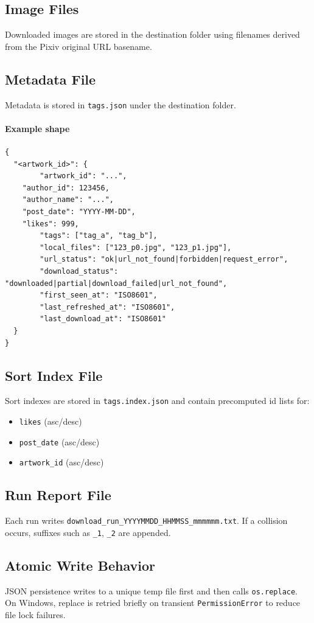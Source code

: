 \documentclass[11pt]{article}
\begin{document}
\subsection{Image Files}
Downloaded images are stored in the destination folder using filenames derived from the Pixiv original URL basename.

\subsection{Metadata File}
Metadata is stored in \texttt{tags.json} under the destination folder.

\paragraph{Example shape}
\begin{verbatim}
{
  "<artwork_id>": {
        "artwork_id": "...",
    "author_id": 123456,
    "author_name": "...",
    "post_date": "YYYY-MM-DD",
    "likes": 999,
        "tags": ["tag_a", "tag_b"],
        "local_files": ["123_p0.jpg", "123_p1.jpg"],
        "url_status": "ok|url_not_found|forbidden|request_error",
        "download_status": "downloaded|partial|download_failed|url_not_found",
        "first_seen_at": "ISO8601",
        "last_refreshed_at": "ISO8601",
        "last_download_at": "ISO8601"
  }
}
\end{verbatim}

\subsection{Sort Index File}
Sort indexes are stored in \texttt{tags.index.json} and contain precomputed id lists for:
\begin{itemize}
        \item \texttt{likes} (asc/desc)
        \item \texttt{post\_date} (asc/desc)
        \item \texttt{artwork\_id} (asc/desc)
\end{itemize}

\subsection{Run Report File}
Each run writes \texttt{download\_run\_YYYYMMDD\_HHMMSS\_mmmmmm.txt}. If a collision occurs, suffixes
such as \texttt{\_1}, \texttt{\_2} are appended.

\subsection{Atomic Write Behavior}
JSON persistence writes to a unique temp file first and then calls \texttt{os.replace}. On Windows,
replace is retried briefly on transient \texttt{PermissionError} to reduce file lock failures.
\end{document}
